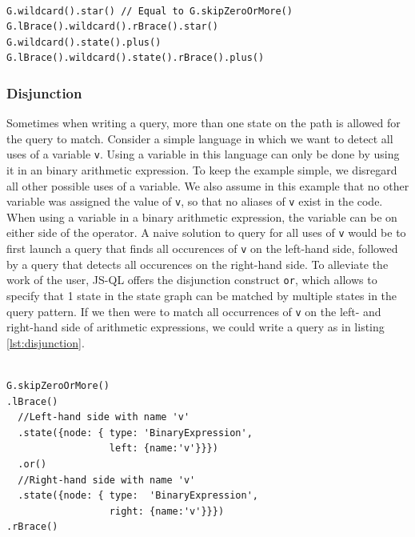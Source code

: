 \begin{lstlisting}[label={lst:KleeneOperations},language=JSQL,caption=Kleene operations differences,mathescape=true]  % float=t?

G.wildcard().star() // Equal to G.skipZeroOrMore()
G.lBrace().wildcard().rBrace().star()
G.wildcard().state().plus()
G.lBrace().wildcard().state().rBrace().plus()
\end{lstlisting}

\subsubsection{Disjunction}

Sometimes when writing a query, more than one state on the path is allowed for the query to match. Consider a simple language in which we want to detect all uses of a variable \texttt{v}. Using a variable in this language can only be done by using it in an binary arithmetic expression. To keep the example simple, we disregard all other possible uses of a variable. We also assume in this example that no other variable was assigned the value of \texttt{v}, so that no aliases of \texttt{v} exist in the code. When using a variable in a binary arithmetic expression, the variable can be on either side of the operator. A naive solution to query for all uses of \texttt{v} would be to first launch a query that finds all occurences of \texttt{v} on the left-hand side, followed by a query that detects all occurences on the right-hand side. To alleviate the work of the user, JS-QL offers the disjunction construct \texttt{or}, which allows to specify that 1 state in the state graph can be matched by multiple states in the query pattern. If we then were to match all occurrences of \texttt{v} on the left- and right-hand side of arithmetic expressions, we could write a query as in listing \ref{lst:disjunction}.

\begin{lstlisting}[label={lst:disjunction},language=JSQL,caption=The JS-QL disjunction operator,mathescape=true]  % float=t?

G.skipZeroOrMore()
.lBrace()
  //Left-hand side with name 'v'
  .state({node: { type: 'BinaryExpression',
                  left: {name:'v'}}})      
  .or()
  //Right-hand side with name 'v'
  .state({node: { type:  'BinaryExpression',
                  right: {name:'v'}}})
.rBrace()
\end{lstlisting}

